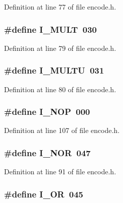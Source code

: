 Definition at line 77 of file encode.\+h.

\subsubsection[{I\+\_\+\+M\+U\+LT}]{\setlength{\rightskip}{0pt plus 5cm}\#define I\+\_\+\+M\+U\+LT~030}\label{encode_8h_a2dfc383288854adb91b7ef06a49f684a}


Definition at line 79 of file encode.\+h.

\subsubsection[{I\+\_\+\+M\+U\+L\+TU}]{\setlength{\rightskip}{0pt plus 5cm}\#define I\+\_\+\+M\+U\+L\+TU~031}\label{encode_8h_af255fb4d9b3ce439eee06b81aee97570}


Definition at line 80 of file encode.\+h.

\subsubsection[{I\+\_\+\+N\+OP}]{\setlength{\rightskip}{0pt plus 5cm}\#define I\+\_\+\+N\+OP~000}\label{encode_8h_ad2008e7158abb6a2db9605568052a61e}


Definition at line 107 of file encode.\+h.

\subsubsection[{I\+\_\+\+N\+OR}]{\setlength{\rightskip}{0pt plus 5cm}\#define I\+\_\+\+N\+OR~047}\label{encode_8h_aea2b0ee6eb4204f87f91446bca061f90}


Definition at line 91 of file encode.\+h.

\subsubsection[{I\+\_\+\+OR}]{\setlength{\rightskip}{0pt plus 5cm}\#define I\+\_\+\+OR~045}\label{encode_8h_adf4334b20b3da95fbe7ef3cb255c146c}


